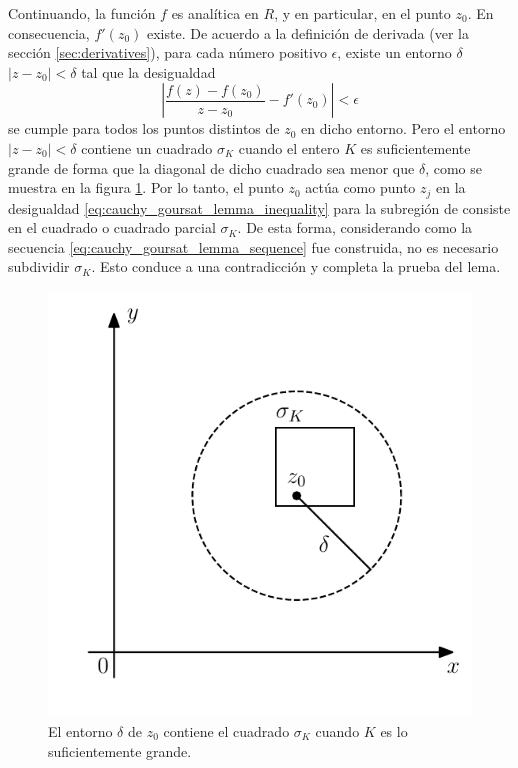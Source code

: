 \documentclass[a4paper]{report}
\begin{document}
Continuando, la función \(f\) es analítica en \(R\), y en particular, en el punto \(z_0\). En consecuencia, \(f'(z_0)\) existe. De acuerdo a la definición de derivada (ver la sección \ref{sec:derivatives}), para cada número positivo \(\epsilon\), existe un entorno \(\delta\) \(|z-z_0|<\delta\) tal que la desigualdad
\[
 \left|\frac{f(z)-f(z_0)}{z-z_0}-f'(z_0)\right|<\epsilon
\]
se cumple para todos los puntos distintos de \(z_0\) en dicho entorno. Pero el entorno \(|z-z_0|<\delta\) contiene un cuadrado \(\sigma_K\) cuando el entero \(K\) es suficientemente grande de forma que la diagonal de dicho cuadrado sea menor que \(\delta\), como se muestra en la figura \ref{fig:cauchy_goursat_lemma_z0}. Por lo tanto, el punto \(z_0\) actúa como punto \(z_j\) en la desigualdad \ref{eq:cauchy_goursat_lemma_inequality} para la subregión de consiste en el cuadrado o cuadrado parcial \(\sigma_K\). De esta forma, considerando como la secuencia \ref{eq:cauchy_goursat_lemma_sequence} fue construida, no es necesario subdividir \(\sigma_K\). Esto conduce a una contradicción y completa la prueba del lema.
\begin{figure}[!htb]
  \begin{minipage}[c]{0.45\textwidth}
    \includegraphics[width=\textwidth]{figuras/cauchy_goursat_lemma_z0.pdf}
  \end{minipage}\hfill
  \begin{minipage}[c]{0.45\textwidth}
    \caption{
        El entorno \(\delta\) de \(z_0\) contiene el cuadrado \(\sigma_K\) cuando \(K\) es lo suficientemente grande.
    }\label{fig:cauchy_goursat_lemma_z0}
  \end{minipage}
\end{figure}
\end{document}
